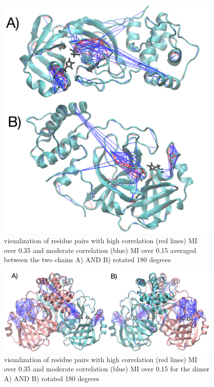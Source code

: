 \documentclass{biophys-new}
\begin{document}
\begin{figure}[hbt!]
\centering
\includegraphics[width=0.6\linewidth]{supplemental_figures/Averaged_MI_image_smaller.png}
\caption{visualization of residue pairs with high correlation (red lines) MI over 0.35 and moderate correlation (blue) MI over 0.15 averaged between the two chains A) AND B) rotated 180 degrees}
\label{fig:view}
\end{figure}

\begin{figure}[hbt!]
\centering
\includegraphics[width=0.6\linewidth]{supplemental_figures/dimer_MI_image.png}
\caption{visualization of residue pairs with high correlation (red lines) MI over 0.35 and moderate correlation (blue) MI over 0.15 for the dimer A) AND B) rotated 180 degrees}
\label{fig:view}
\end{figure}
\end{document}
